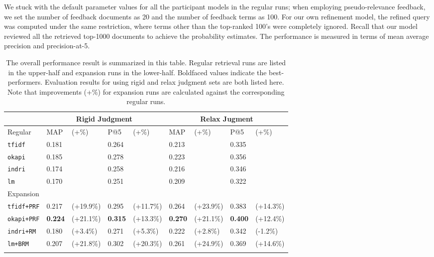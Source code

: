 We stuck with the default parameter values {for} all the participant models in
the regular runs; when employing pseudo-relevance feedback, we set the number
of feedback documents as 20 and the number of feedback terms as 100.  For our
own refinement model, the refined query was computed under the same
restriction, where terms other than the top-ranked 100's were completely
ignored.  Recall that our model reviewed all the retrieved top-1000 documents
to achieve the probability estimates.  The performance is measured in terms of
mean average precision and precision-at-5.  

\begin{table}[ht!]
  \centering
  \begin{tabular}{p{2.4cm}llllllll}
    & \multicolumn{4}{c}{Rigid Judgment} & \multicolumn{4}{c}{Relax Jugment} \\
    \hline
    Regular & MAP & (+\%) & P@5 & (+\%) & MAP & (+\%) & P@5 & (+\%) \\
    \hline
    {\tt tfidf} & 0.181 & & 0.264 & & 0.213 & & 0.335 & \\
    {\tt okapi} & 0.185 & & 0.278 & & 0.223 & & 0.356 & \\
    {\tt indri} & 0.174 & & 0.258 & & 0.216 & & 0.346 & \\
    {\tt lm}    & 0.170 & & 0.251 & & 0.209 & & 0.322 & \\
    \hline
    Expansion & & & & & & & & \\
    \hline
    {\tt tfidf+PRF} & 0.217 & (+19.9\%) & 0.295 & (+11.7\%) & 0.264 & (+23.9\%) & 0.383 & (+14.3\%) \\
    {\tt okapi+PRF} & {\bf 0.224} & (+21.1\%) & {\bf 0.315} & (+13.3\%) & {\bf 0.270} & (+21.1\%) & {\bf 0.400} & (+12.4\%) \\
    {\tt indri+RM} & 0.180 & (+3.4\%) & 0.271 & (+5.3\%) & 0.222 & (+2.8\%) & 0.342 & (-1.2\%) \\
    {\tt lm+BRM} & 0.207 & (+21.8\%) & 0.302 & (+20.3\%) & 0.261 & (+24.9\%) & 0.369 & (+14.6\%) \\
    \\
  \end{tabular}
  \caption{The overall performance result is summarized in this table.  Regular
  retrieval runs are listed in the upper-half and expansion runs in the
  lower-half.  Boldfaced values indicate the best-performers.  Evaluation
  results for using rigid and relax judgment sets are both listed here.  Note
  that improvements (+\%) for expansion runs are calculated against the
  corresponding regular runs.} \label{t:retrieval}
\end{table}

